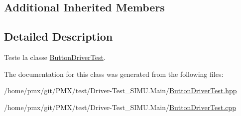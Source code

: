 \subsection*{Additional Inherited Members}


\subsection{Detailed Description}
Teste la classe \hyperlink{classtest_1_1ButtonDriverTest}{Button\+Driver\+Test}. 

The documentation for this class was generated from the following files\+:\begin{DoxyCompactItemize}
\item 
/home/pmx/git/\+P\+M\+X/test/\+Driver-\/\+Test\+\_\+\+S\+I\+M\+U.\+Main/\hyperlink{ButtonDriverTest_8hpp}{Button\+Driver\+Test.\+hpp}\item 
/home/pmx/git/\+P\+M\+X/test/\+Driver-\/\+Test\+\_\+\+S\+I\+M\+U.\+Main/\hyperlink{ButtonDriverTest_8cpp}{Button\+Driver\+Test.\+cpp}\end{DoxyCompactItemize}
